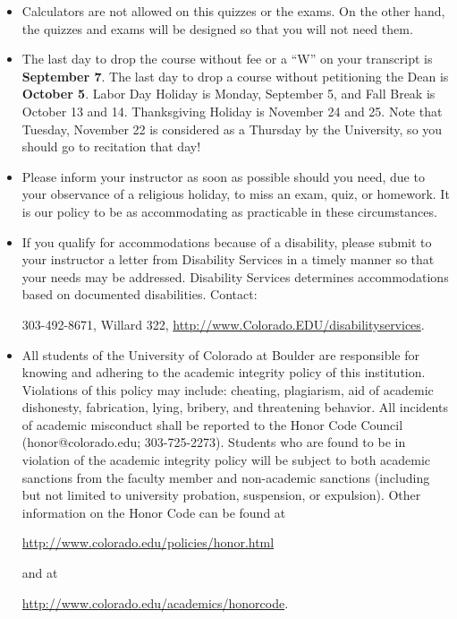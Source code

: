 \documentclass[12pt]{article}
\begin{document}
{{\vskip 10pt

\begin{itemize}
\item[] Calculators are not allowed on this quizzes or the exams. On the other hand, the quizzes and exams will be designed so that you will not need them.
\end{itemize}

\vskip 10pt

\begin{itemize}
\item[] The last day to drop the course without fee or a ``W'' on your
transcript is {\bf September 7}.  The last day to drop a course without
petitioning the Dean is {\bf October 5}. Labor Day Holiday is Monday, September 5,
and Fall Break is October 13 and 14. Thanksgiving Holiday is November 24 and 25. Note that
Tuesday, November 22 is considered as a Thursday by the University, so you should
go to recitation that day!
\smallskip
\item[] Please inform your instructor as soon as possible
should you need, due to your observance
of a religious holiday, to miss an exam, quiz, or homework. It is our
policy to be as accommodating as practicable in these circumstances.
\smallskip
\item[] If you qualify for accommodations because of a disability, please submit to
your instructor a letter from Disability Services in a timely manner so that your needs may
be addressed.  Disability Services determines accommodations based on
documented disabilities.  Contact:
\vskip 2pt
\smallskip
\centerline {303-492-8671, Willard 322, \url{http://www.Colorado.EDU/disabilityservices}.}
\vskip 2pt
\smallskip
\item[] All students of the University of Colorado at Boulder are responsible for
knowing and adhering to the academic integrity policy of this institution.
Violations of this policy may include: cheating, plagiarism, aid of academic
dishonesty, fabrication, lying, bribery, and threatening behavior.  All
incidents of academic misconduct shall be reported to the Honor Code Council
(honor@colorado.edu; 303-725-2273). Students who are found to be in violation
of the academic integrity policy will be subject to both academic sanctions
from the faculty member and non-academic sanctions (including but not limited
to university probation, suspension, or expulsion). Other information on the
Honor Code can be found at
\vskip 2pt
\smallskip
\centerline {\url{http://www.colorado.edu/policies/honor.html}}
\vskip 2pt
and at
\vskip 2pt
\centerline {\url{http://www.colorado.edu/academics/honorcode}.}
\vskip 2pt
\smallskip


\end{itemize}}}
\end{document}
